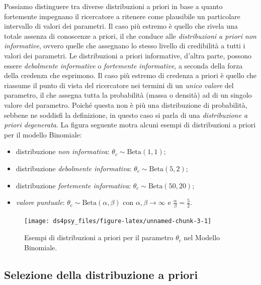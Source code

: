 \documentclass[
  11pt,
]{krantz}
\providecommand{\tightlist}{%
  \setlength{\itemsep}{0pt}\setlength{\parskip}{0pt}}
\theoremstyle{definition}
\theoremstyle{definition}
\theoremstyle{definition}
\theoremstyle{definition}
\theoremstyle{remark}
\begin{document}
Possiamo distinguere tra diverse distribuzioni a priori in base a quanto fortemente impegnano il ricercatore a ritenere come plausibile un particolare intervallo di valori dei parametri. Il caso più estremo è quello che rivela una totale assenza di conoscenze a priori, il che conduce alle \emph{distribuzioni a priori non informative}, ovvero quelle che assegnano lo stesso livello di credibilità a tutti i valori dei parametri. Le distribuzioni a priori informative, d'altra parte, possono essere \emph{debolmente informative} o \emph{fortemente informative}, a seconda della forza della credenza che esprimono. Il caso più estremo di credenza a priori è quello che riassume il punto di vista del ricercatore nei termini di un \emph{unico valore} del parametro, il che assegna tutta la probabilità (massa o densità) ad di un singolo valore del parametro. Poiché questa non è più una distribuzione di probabilità, sebbene ne soddisfi la definizione, in questo caso si parla di una \emph{distribuzione a priori degenerata}. La figura seguente motra alcuni esempi di distribuzioni a priori per il modello Binomiale:

\begin{itemize}
\tightlist
\item
  distribuzione \emph{non informativa}: \(\theta_c \sim \mbox{Beta}(1,1)\);
\item
  distribuzione \emph{debolmente informativa}: \(\theta_c \sim \mbox{Beta}(5,2)\);
\item
  distribuzione \emph{fortemente informativa}: \(\theta_c \sim \mbox{Beta}(50,20)\);
\item
  \emph{valore puntuale}: \(\theta_c \sim \mbox{Beta}(\alpha, \beta)\) con \(\alpha, \beta \rightarrow \infty\) e \(\frac{\alpha}{\beta} = \frac{5}{2}\).
\end{itemize}

\begin{figure}

{\centering \texttt{[image: ds4psy\_files/figure-latex/unnamed-chunk-3-1]} 

}

\caption{Esempi di distribuzioni a priori per il parametro $\theta_c$ nel Modello Binomiale.}\label{fig:unnamed-chunk-3}
\end{figure}

\hypertarget{selezione-della-distribuzione-a-priori}{%
\subsection{Selezione della distribuzione a priori}\label{selezione-della-distribuzione-a-priori}}
\end{document}
